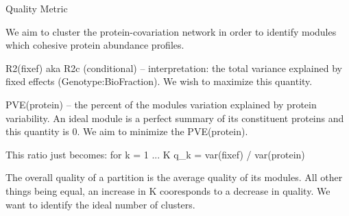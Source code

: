Quality Metric


We aim to cluster the protein-covariation network in order to identify modules
which cohesive protein abundance profiles.

R2(fixef) aka R2c (conditional) -- interpretation: the total variance explained
by fixed effects (Genotype:BioFraction). We wish to maximize this quantity.

PVE(protein) -- the percent of the modules variation explained by protein
variability. An ideal module is a perfect summary of its constituent proteins
and this quantity is 0. We aim to minimize the PVE(protein).

This ratio just becomes:
for k = 1 ... K
q_k = var(fixef) / var(protein)

The overall quality of a partition is the average quality of its modules.
All other things being equal, an increase in K cooresponds to a decrease in
quality. We want to identify the ideal number of clusters.

